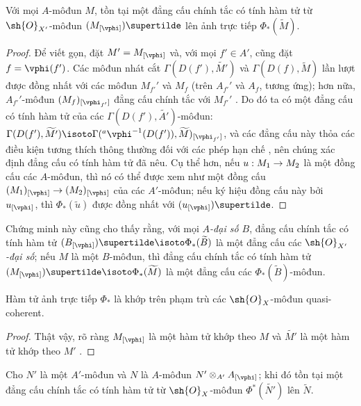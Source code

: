 \documentclass[oneside]{amsart}
\makeatletter
\newcommand{\ega@arrow}[2]{\mathchoice{#1}{#2}{#2}{#2}}
\renewcommand{\to}{\ega@arrow{\longrightarrow}{\rightarrow}}
\newcommand{\oldpage}[2][]{{\marginnote{\normalfont\textbf{#1}~|~#2}}\ignorespaces}
\let\EGAOriginalLabel\label
\renewcommand{\label}[1]{\phantomsection\EGAOriginalLabel{#1}}
\makeatother
\begin{document}
\begin{proposition}[1.6.3]
\label{I.1.6.3}
Với mọi $A$-môđun $M$, tồn tại một đẳng cấu chính tắc có tính hàm tử từ
$\sh{O}_{X'}$-môđun $(M_{[\vphi]})\supertilde$ lên ảnh trực tiếp
$\Phi_*(\widetilde{M})$.
\end{proposition}

\begin{proof}
Để viết gọn, đặt $M'=M_{[\vphi]}$ và, với mọi $f'\in A'$, cũng đặt
$f=\vphi(f')$.
Các môđun nhát cắt $\Gamma(D(f'),\widetilde{M'})$ và
$\Gamma(D(f),\widetilde{M})$ lần lượt được đồng nhất với các môđun $M_{f'}'$
và $M_f$ (trên $A_{f'}'$ và $A_f$, tương ứng); hơn nữa,
$A_{f'}'$-môđun $(M_f)_{[\vphi_{f'}]}$ đẳng cấu chính tắc với $M_{f'}'$
.
Do đó ta có một đẳng cấu có tính hàm tử của các
$\Gamma(D(f'),\widetilde{A'})$-môđun:
$\Gamma(D(f'),\widetilde{M'})\isoto
\Gamma({}^a\vphi^{-1}(D(f')),\widetilde{M})_{[\vphi_{f'}]}$, và các đẳng cấu
này thỏa các điều kiện tương thích thông thường đối với các phép hạn chế
, nên chúng xác định đẳng cấu có tính hàm tử đã nêu.
Cụ thể hơn, nếu $u:M_1\to M_2$ là một đồng cấu các $A$-môđun, thì nó có thể
được xem như một đồng cấu $(M_1)_{[\vphi]}\to(M_2)_{[\vphi]}$ của các
$A'$-môđun; nếu ký hiệu đồng cấu này bởi $u_{[\vphi]}$, thì
$\Phi_*(\widetilde{u})$ được đồng nhất với $(u_{[\vphi]})\supertilde$.
\end{proof}

Chứng minh này cũng cho thấy rằng, với mọi \emph{$A$-đại số $B$}, đẳng cấu
chính tắc có tính hàm tử
\oldpage[I]{95}
$(B_{[\vphi]})\supertilde\isoto\Phi_*(\widetilde{B})$ là một đẳng cấu các
\emph{$\sh{O}_{X'}$-đại số}; nếu $M$ là một $B$-môđun, thì đẳng cấu chính tắc
có tính hàm tử
$(M_{[\vphi]})\supertilde\isoto\Phi_*(\widetilde{M})$ là một đẳng cấu các
$\Phi_*(\widetilde{B})$-môđun.

\begin{corollary}[1.6.4]
\label{I.1.6.4}
Hàm tử ảnh trực tiếp $\Phi_*$ là khớp trên phạm trù các
$\sh{O}_X$-môđun quasi-coherent.
\end{corollary}

\begin{proof}
Thật vậy, rõ ràng $M_{[\vphi]}$ là một hàm tử khớp theo $M$ và
$\widetilde{M'}$ là một hàm tử khớp theo $M'$ .
\end{proof}

\begin{proposition}[1.6.5]
\label{I.1.6.5}
Cho $N'$ là một $A'$-môđun và $N$ là $A$-môđun
$N'\otimes_{A'}A_{[\vphi]}$; khi đó tồn tại một đẳng cấu chính tắc có tính
hàm tử từ $\sh{O}_X$-môđun $\Phi^*(\widetilde{N'})$ lên $\widetilde{N}$.
\end{proposition}
\end{document}
